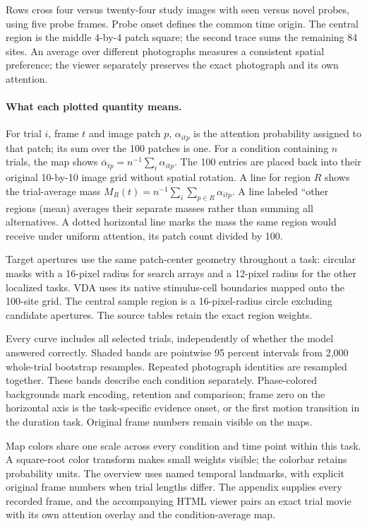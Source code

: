\documentclass[11pt]{article}
\begin{document}
Rows cross four versus twenty-four study images with seen versus novel probes, using five probe frames. Probe onset defines the common time origin. The central region is the middle 4-by-4 patch square; the second trace sums the remaining 84 sites. An average over different photographs measures a consistent spatial preference; the viewer separately preserves the exact photograph and its own attention.

\paragraph{What each plotted quantity means.}
For trial $i$, frame $t$ and image patch $p$, $\alpha_{itp}$ is the attention probability assigned to that patch; its sum over the 100 patches is one. For a condition containing $n$ trials, the map shows $\bar\alpha_{tp}=n^{-1}\sum_i\alpha_{itp}$. The 100 entries are placed back into their original 10-by-10 image grid without spatial rotation. A line for region $R$ shows the trial-average mass $M_R(t)=n^{-1}\sum_i\sum_{p\in R}\alpha_{itp}$. A line labeled ``other regions (mean) averages their separate masses rather than summing all alternatives. A dotted horizontal line marks the mass the same region would receive under uniform attention, its patch count divided by 100.

Target apertures use the same patch-center geometry throughout a task: circular masks with a 16-pixel radius for search arrays and a 12-pixel radius for the other localized tasks. VDA uses its native stimulus-cell boundaries mapped onto the 100-site grid. The central sample region is a 16-pixel-radius circle excluding candidate apertures. The source tables retain the exact region weights.

Every curve includes all selected trials, independently of whether the model answered correctly. Shaded bands are pointwise 95 percent intervals from 2,000 whole-trial bootstrap resamples. Repeated photograph identities are resampled together. These bands describe each condition separately. Phase-colored backgrounds mark encoding, retention and comparison; frame zero on the horizontal axis is the task-specific evidence onset, or the first motion transition in the duration task. Original frame numbers remain visible on the maps.

Map colors share one scale across every condition and time point within this task. A square-root color transform makes small weights visible; the colorbar retains probability units. The overview uses named temporal landmarks, with explicit original frame numbers when trial lengths differ. The appendix supplies every recorded frame, and the accompanying HTML viewer pairs an exact trial movie with its own attention overlay and the condition-average map.
\end{document}
